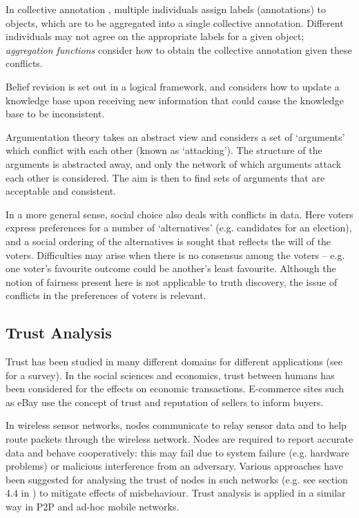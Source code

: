 \documentclass[../main.tex]{subfiles}
\begin{document}
In collective annotation \cite{kruger}, multiple individuals assign labels
(annotations) to objects, which are to be aggregated into a single collective
annotation. Different individuals may not agree on the appropriate labels for a
given object; \emph{aggregation functions} consider how to obtain the
collective annotation given these conflicts.

Belief revision \cite{gardenfors} is set out in a logical framework, and
considers how to update a knowledge base upon receiving new information that
could cause the knowledge base to be inconsistent.

Argumentation theory \cite{hofa_semantics} takes an abstract view and considers
a set of `arguments' which conflict with each other (known as `attacking'). The
structure of the arguments is abstracted away, and only the network of which
arguments attack each other is considered. The aim is then to find sets of
arguments that are acceptable and consistent.

In a more general sense, social choice also deals with conflicts in data. Here
voters express preferences for a number of `alternatives' (e.g. candidates for
an election), and a social ordering of the alternatives is sought that reflects
the will of the voters. Difficulties may arise when there is no consensus among
the voters -- e.g. one voter's favourite outcome could be another's least
favourite. Although the notion of fairness present here is not applicable
to truth discovery, the issue of conflicts in the preferences of voters is
relevant.

\subsection{Trust Analysis}

Trust has been studied in many different domains for different applications
(see \cite{momani_challa} for a survey). In the social sciences and economics,
trust between humans has been considered for the effects on economic
transactions. E-commerce sites such as eBay use the concept of trust and
reputation of sellers to inform buyers.

In wireless sensor networks, nodes communicate to relay sensor data and to help
route packets through the wireless network. Nodes are required to report
accurate data and behave cooperatively: this may fail due to system failure
(e.g. hardware problems) or malicious interference from an adversary. Various
approaches have been suggested for analysing the trust of nodes in such
networks (e.g. see section 4.4 in \cite{momani_challa}) to mitigate effects of
misbehaviour. Trust analysis is applied in a similar way in P2P and ad-hoc
mobile networks.
\end{document}
